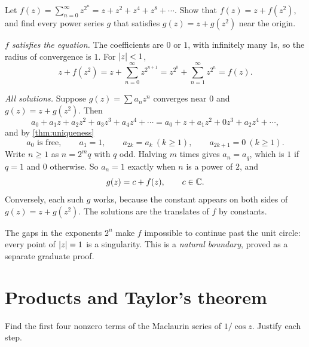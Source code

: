 

\begin{exercise}\label{ex:lacunary}
  Let $f(z) = \sum_{n=0}^{\infty} z^{2^n} = z + z^2 + z^4 + z^8 + \dotsb$.
  Show that $f(z) = z + f(z^2)$, and find every power series $g$ that
  satisfies $g(z) = z + g(z^2)$ near the origin.
\end{exercise}

\begin{solution}
  \emph{$f$ satisfies the equation.} The coefficients are $0$ or $1$, with
  infinitely many $1$s, so the radius of convergence is $1$. For $\lvert z\rvert < 1$,
  \[
    z + f(z^2) = z + \sum_{n=0}^{\infty} z^{2^{n+1}}
      = z^{2^0} + \sum_{n=1}^{\infty} z^{2^n} = f(z).
  \]

  \emph{All solutions.} Suppose $g(z) = \sum a_n z^n$ converges near $0$ and
  $g(z) = z + g(z^2)$. Then
  \[
    a_0 + a_1 z + a_2 z^2 + a_3 z^3 + a_4 z^4 + \dotsb
    = a_0 + z + a_1 z^2 + 0 z^3 + a_2 z^4 + \dotsb,
  \]
  and by \cref{thm:uniqueness}
  \[
    a_0 \text{ is free}, \qquad a_1 = 1, \qquad
    a_{2k} = a_k \ (k \geq 1), \qquad a_{2k+1} = 0 \ (k \geq 1).
  \]
  Write $n \geq 1$ as $n = 2^m q$ with $q$ odd. Halving $m$ times gives
  $a_n = a_q$, which is $1$ if $q = 1$ and $0$ otherwise. So $a_n = 1$
  exactly when $n$ is a power of $2$, and
  \[
    g(z) = c + f(z), \qquad c \in \mathbb{C}.
  \]
  Conversely, each such $g$ works, because the constant appears on both sides
  of $g(z) = z + g(z^2)$. The solutions are the translates of $f$ by
  constants. \qedhere
\end{solution}

\begin{remark}
  The gaps in the exponents $2^n$ make $f$ impossible to continue past the
  unit circle: every point of $\lvert z\rvert = 1$ is a singularity. This is a
  \emph{natural boundary}, proved as a separate graduate proof.
\end{remark}

\section{Products and Taylor's theorem}\label{sec:products}




\begin{exercise}\label{ex:secant}
  Find the first four nonzero terms of the Maclaurin series of $1/\cos z$.
  Justify each step.
\end{exercise}

